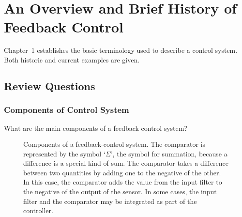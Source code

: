 
\chapter{An Overview and Brief History of Feedback Control}

Chapter~1 establishes the basic terminology used to describe a control system.
Both historic and current examples are given.

\section{Review Questions}

\subsection{Components of Control System}

\begin{prob}
   What are the main components of a feedback control system?
\end{prob}

\begin{figure}
   \begin{center}
      \caption{%
         Components of a feedback-control system. The comparator is represented
         by the symbol `$\Sigma$', the symbol for summation, because a
         difference is a special kind of sum. The comparator takes a difference
         between two quantities by adding one to the negative of the other. In
         this case, the comparator adds the value from the input filter to the
         negative of the output of the sensor. In some cases, the input filter
         and the comparator may be integrated as part of the controller.%
      }
      \label{fig:control}
   \end{center}
\end{figure}

